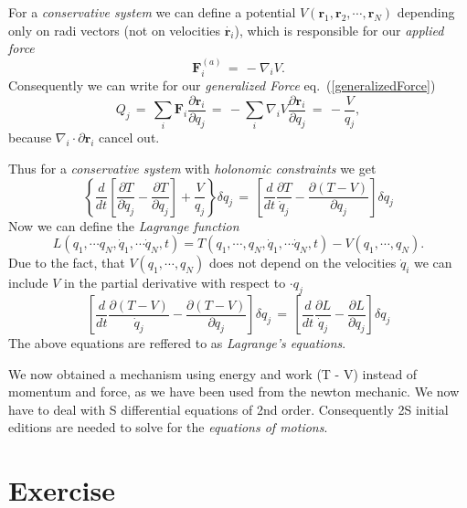 \documentclass{report}
\renewcommand{\vec}[1]{\mathbf{#1}}
\begin{document}
For a \textit{conservative system} we can define a potential $V(\vec r_1, \vec
r_2, \cdots, \vec r_N)$ depending only on radi vectors (not on velocities
$\dot{\vec r_i}$), which is responsible for our \textit{applied force}
\begin{equation}
  \vec F_i^{(a)} \,=\, -\nabla_i V.
\end{equation}
Consequently we can write for our \textit{generalized Force}
eq.~(\ref{generalizedForce}) 
\begin{equation}
  Q_j \,=\, \sum_i \vec F_i \frac{\partial \vec r_i}{\partial q_j} \,=\,
- \sum_i \nabla_i V \frac{\partial \vec r_i}{\partial q_j} \,=\,
-\frac{V}{q_j}, 
\end{equation}
because $\nabla_i \cdot \partial \vec r_i$ cancel out.

Thus for a \textit{conservative system} with \textit{holonomic constraints} we
get
\begin{equation}
  \left\{ \frac{d}{dt} \left[\frac{\partial T}{\partial \dot q_j} - \frac{\partial
T}{\partial q_j} \right] + \frac{V}{q_j}\right\} \delta q_j \,=\, \left[
\frac{d}{dt} \frac{\partial T}{\dot q_j} - \frac{\partial (T - V)}{\partial
q_j} \right] \delta q_j 
\end{equation}
Now we can define the \textit{Lagrange function}
\begin{equation}
  L(q_1, \cdots q_N, \dot q_1, \cdots \dot q_N, t) = T(q_1, \cdots, q_N, \dot
q_1, \cdots \dot q_N, t) - V(q_1, \cdots, q_N).
\end{equation}
Due to the fact, that $V(q_1, \cdots, q_N)$ does not depend on the velocities $\dot
q_i$ we can include $V$ in the partial derivative with respect to $\cdot q_j$
\begin{equation}
\left[ \frac{d}{dt} \frac{\partial (T-V)}{\dot q_j} - \frac{\partial (T - V)}{\partial
q_j} \right] \delta q_j  \,=\, \left[ \frac{d}{dt} \frac{\partial L}{\dot q_j}
- \frac{\partial L}{\partial
q_j} \right] \delta q_j
\end{equation}
The above equations are reffered to as \textit{Lagrange's equations}.

We now obtained a mechanism using energy and work (T - V) instead of momentum
and force, as we have been used from the newton mechanic. We now have to deal
with S differential equations of 2nd order. Consequently 2S initial editions
are needed to solve for the \textit{equations of motions}.

\section{Exercise}
\end{document}
